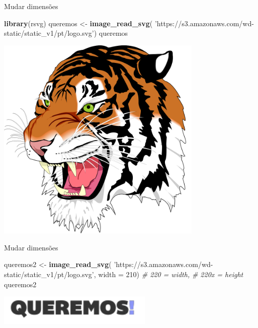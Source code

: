 \documentclass[
  ignorenonframetext,
]{beamer}
\newenvironment{Shaded}{\begin{snugshade}}{\end{snugshade}}
\newcommand{\CommentTok}[1]{\textcolor[rgb]{0.56,0.35,0.01}{\textit{#1}}}
\newcommand{\DataTypeTok}[1]{\textcolor[rgb]{0.13,0.29,0.53}{#1}}
\newcommand{\DecValTok}[1]{\textcolor[rgb]{0.00,0.00,0.81}{#1}}
\newcommand{\KeywordTok}[1]{\textcolor[rgb]{0.13,0.29,0.53}{\textbf{#1}}}
\newcommand{\NormalTok}[1]{#1}
\newcommand{\StringTok}[1]{\textcolor[rgb]{0.31,0.60,0.02}{#1}}
\begin{document}
\begin{frame}[fragile]{Mudar dimensões}
\protect\hypertarget{mudar-dimensuxf5es}{}

\small

\begin{Shaded}
\begin{Highlighting}[]
\KeywordTok{library}\NormalTok{(rsvg)}
\NormalTok{queremos <-}\StringTok{ }\KeywordTok{image_read_svg}\NormalTok{(}
  \StringTok{'https://s3.amazonaws.com/wd-static/static_v1/pt/logo.svg'}\NormalTok{)}
\NormalTok{queremos}
\end{Highlighting}
\end{Shaded}

\includegraphics[width=3.89in]{SLIDES_files/figure-beamer/2-1}

\end{frame}

\begin{frame}[fragile]{Mudar dimensões}
\protect\hypertarget{mudar-dimensuxf5es-1}{}

\small

\begin{Shaded}
\begin{Highlighting}[]
\NormalTok{queremos2 <-}\StringTok{ }\KeywordTok{image_read_svg}\NormalTok{(}
  \StringTok{'https://s3.amazonaws.com/wd-static/static_v1/pt/logo.svg'}\NormalTok{,}
  \DataTypeTok{width =} \DecValTok{210}\NormalTok{) }\CommentTok{# 220 = width,}
               \CommentTok{# 220x = height}
\NormalTok{queremos2}
\end{Highlighting}
\end{Shaded}

\includegraphics[width=2.92in]{SLIDES_files/figure-beamer/2.1-1}

\end{frame}
\end{document}
